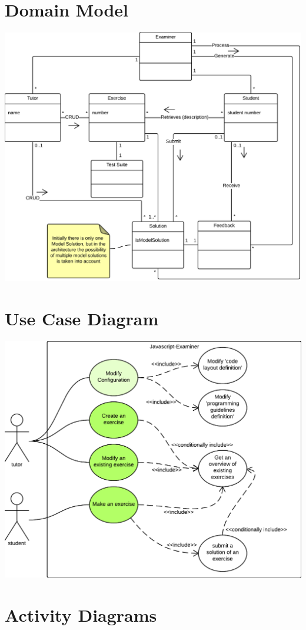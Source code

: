 \section{Domain Model}
\includegraphics[scale=0.8]{diagrams-images/domain-model}
\section{Use Case Diagram}
\includegraphics[scale=1.2]{diagrams-images/use-case-diagram}
\section{Activity Diagrams}
